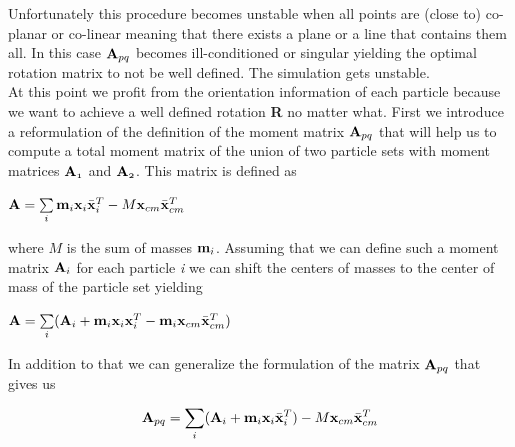 \documentclass[
	11pt, 
	DIV10,
	a4paper, 
	oneside, 
	headings=normal, 
	captions=tableheading,
	final, 
	numbers=noenddot
]{scrartcl}
\begin{document}
	\noindent Unfortunately this procedure becomes unstable when all points are (close to) co-planar or co-linear meaning that there exists a plane or a line that contains them all. In this case $\mathnormal{\mathbf{A}_{pq}}$ becomes ill-conditioned or singular yielding the optimal rotation matrix to not be well defined. The simulation gets unstable.\cite{2}\\
	At this point we profit from the orientation information of each particle because we want to achieve a well defined rotation \textbf{R} no matter what. First we introduce a reformulation of the definition of the moment matrix $\mathnormal{\mathbf{A}_{pq}}$ that will help us to compute a total moment matrix of the union of two particle sets with moment matrices $\mathnormal{\mathbf{A}_1}$ and $\mathnormal{\mathbf{A}_2}$. This matrix is defined as
	\begin{center}
		$\mathnormal{\mathbf{A}}=\sum\limits_{i}\mathnormal{\mathbf{m}_i \mathbf{x}_i \mathbf{\bar{x}}^T_i}-M\mathnormal{\mathbf{x}_{cm} \mathbf{\bar{x}}_{cm}^T}$
	\end{center}
	\noindent where $M$ is the sum of masses $\mathnormal{\mathbf{m}_i}$. Assuming that we can define such a moment matrix $\mathnormal{\mathbf{A}_i}$ for each particle \textit{i} we can shift the centers of masses to the center of mass of the particle set yielding
	\begin{center}
		$\mathnormal{\mathbf{A}}=\sum\limits_{i}(\mathnormal{\mathbf{A}_i}+\mathnormal{\mathbf{m}_i \mathbf{x}_i \mathbf{x}_i^T - \mathbf{m}_i \mathbf{x}_{cm} \mathbf{\bar{x}}_{cm}^T})$
	\end{center}
	In addition to that we can generalize the formulation of the matrix $\mathnormal{\mathbf{A}_{pq}}$ that gives us
	\begin{center}
		\begin{equation}\label{Apq}
			\mathnormal{\mathbf{A}_{pq}}=\sum\limits_{i}(\mathnormal{\mathbf{A}_i}+\mathnormal{\mathbf{m}_i \mathbf{x}_i \mathbf{\bar{x}}_i^T})-M\mathnormal{\mathbf{x}_{cm} \mathbf{\bar{x}}_{cm}^T}
		\end{equation}
	\end{center}
	
\end{document}
